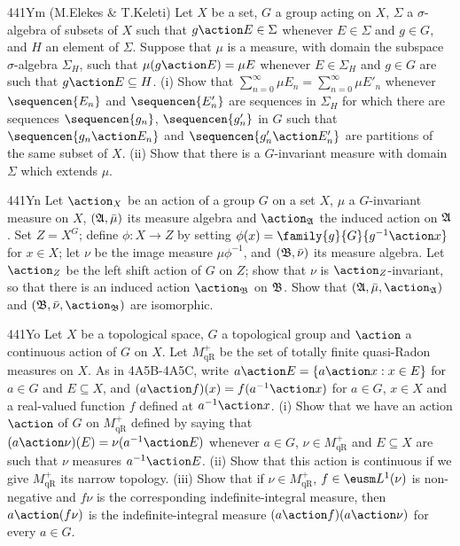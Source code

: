 {\spheader 441Ym (M.Elekes \& T.Keleti) Let $X$ be a set, $G$ a group
acting on $X$,  $\Sigma$ a
$\sigma$-algebra of subsets of $X$ such that $g\action E\in\Sigma$
whenever $E\in\Sigma$ and $g\in G$, and $H$ an element of $\Sigma$.
Suppose that
$\mu$ is a measure, with domain the subspace $\sigma$-algebra
$\Sigma_H$, such that $\mu(g\action E)=\mu E$ whenever $E\in\Sigma_H$
and $g\in G$ are such that $g\action E\subseteq H$.   (i) Show that
$\sum_{n=0}^{\infty}\mu E_n=\sum_{n=0}^{\infty}\mu E'_n$ whenever
$\sequencen{E_n}$ and $\sequencen{E'_n}$ are sequences in $\Sigma_H$ for
which there are sequences $\sequencen{g_n}$, $\sequencen{g'_n}$ in $G$
such that $\sequencen{g_n\action E_n}$ and
$\sequencen{g'_n\action E'_n}$ are partitions of the same subset of $X$.
(ii) Show that there is a $G$-invariant measure with domain $\Sigma$
which extends $\mu$.

\spheader 441Yn Let $\action_X$ be an action of a group $G$ on a set $X$,
$\mu$ a $G$-invariant measure on $X$, $(\frak A,\bar\mu)$ its measure
algebra and $\action_{\frak A}$ the induced action on $\frak A$.
Set $Z=X^G$;  define $\phi:X\to Z$ by
setting $\phi(x)=\family{g}{G}{g^{-1}\action x}$ for $x\in X$;
let $\nu$ be the image
measure $\mu\phi^{-1}$, and $(\frak B,\bar\nu)$ its measure algebra.
Let $\action_Z$ be the left shift action of $G$ on $Z$;  show
that $\nu$ is $\action_Z$-invariant, so that there is an induced action
$\action_{\frak B}$ on $\frak B$.   Show that
$(\frak A,\bar\mu,\action_{\frak A})$ and
$(\frak B,\bar\nu,\action_{\frak B})$ are isomorphic.

\spheader 441Yo
Let $X$ be a topological space, $G$ a topological group and $\action$ a
continuous action of $G$ on $X$.   Let $M_{\text{qR}}^+$ be
the set of totally
finite quasi-Radon measures on $X$.   As in 4A5B-4A5C, write
$a\action E=\{a\action x:x\in E\}$ for $a\in G$ and $E\subseteq X$,
and $(a\action f)(x)=f(a^{-1}\action x)$ for $a\in G$, $x\in X$ and a
real-valued function $f$ defined at $a^{-1}\action x$.
(i) Show that we have
an action $\action$ of $G$ on $M_{\text{qR}}^+$ defined by saying that
$(a\action\nu)(E)=\nu(a^{-1}\action E)$ whenever $a\in G$,
$\nu\in M_{\text{qR}}^+$ and $E\subseteq X$ are such that $\nu$ measures
$a^{-1}\action E$.
(ii) Show that this action is continuous if we give $M_{\text{qR}}^+$
its narrow topology.   (iii) Show that if $\nu\in M_{\text{qR}}^+$,
$f\in\eusm L^1(\nu)$ is non-negative
and $f\nu$ is the corresponding indefinite-integral measure, then
$a\action(f\nu)$ is the
indefinite-integral measure $(a\action f)(a\action\nu)$ for every $a\in G$.

}
